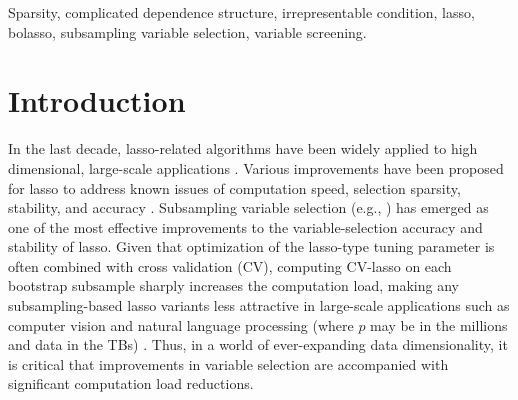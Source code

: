 \documentclass[11pt,authoryear]{elsarticle}
\begin{document}
\begin{keyword}
Sparsity, complicated dependence structure, irrepresentable condition, lasso, bolasso, subsampling variable selection, variable screening.
\end{keyword}

\maketitle




\section{Introduction}

In the last decade, lasso-related algorithms have been widely applied to high dimensional, large-scale applications \citep{efronall04, friedman2007pathwise, friedman2010regularization}. Various improvements have been proposed for lasso to address known issues of computation speed, selection sparsity, stability, and accuracy \citep{weisberg04, lim2016estimation}. Subsampling variable selection (e.g., \citet{bach2008bolasso, meinshausen2010stability}) has emerged as one of the most effective improvements to the variable-selection accuracy and stability of lasso. Given that optimization of the lasso-type tuning parameter is often combined with cross validation (CV), computing CV-lasso on each bootstrap subsample sharply increases the computation load, making any subsampling-based lasso variants less attractive in large-scale applications such as computer vision and natural language processing (where $p$ may be in the millions and data in the TBs) \citep{xu2012asymptotic}. Thus, in a world of ever-expanding data dimensionality, it is critical that improvements in variable selection are accompanied with significant computation load reductions.
\end{document}
